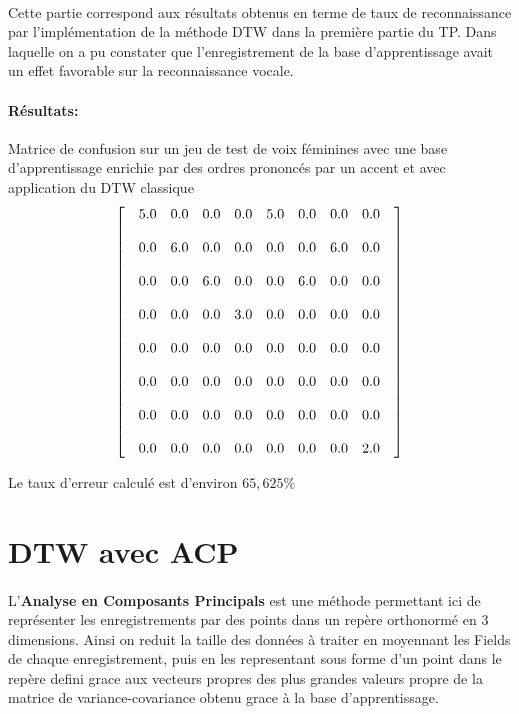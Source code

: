 \documentclass[a4paper,12pt]{report}
\begin{document}
\paragraph{}
Cette partie correspond aux résultats obtenus en terme de taux de reconnaissance par l'implémentation de la méthode DTW dans la première partie du TP. Dans laquelle on a pu constater que l'enregistrement de la base d'apprentissage avait un effet favorable sur la reconnaissance vocale.


\paragraph{Résultats:\\}
 Matrice de confusion sur un jeu de test de voix féminines avec une base d'apprentissage enrichie par des ordres prononcés par un accent  et  avec application du DTW classique
\[
\begin{bmatrix}
  & 5.0 & 0.0 & 0.0 & 0.0  & 5.0 & 0.0 & 0.0 & 0.0 &  \cr \\
  & 0.0 & 6.0 & 0.0 & 0.0  & 0.0 & 0.0 & 6.0 & 0.0 &  \cr \\
  & 0.0 & 0.0 & 6.0 & 0.0  & 0.0 & 6.0 & 0.0 & 0.0 &  \cr \\
  & 0.0 & 0.0 & 0.0 & 3.0  & 0.0 & 0.0 & 0.0 & 0.0 &  \cr \\
  & 0.0 & 0.0 & 0.0 & 0.0  & 0.0 & 0.0 & 0.0 & 0.0 &  \cr \\
  & 0.0 & 0.0 & 0.0 & 0.0  & 0.0 & 0.0 & 0.0 & 0.0 &  \cr \\
  & 0.0 & 0.0 & 0.0 & 0.0  & 0.0 & 0.0 & 0.0 & 0.0 &  \cr \\
  & 0.0 & 0.0 & 0.0 & 0.0  & 0.0 & 0.0 & 0.0 & 2.0 &   
\end{bmatrix}
\]

Le taux d'erreur calculé est d'environ $65,625\%$\\

\newpage
\section{DTW avec ACP}
\paragraph{}
L'\textbf{Analyse en Composants Principals} est une méthode permettant ici de représenter les enregistrements par des points dans un repère orthonormé en 3 dimensions. Ainsi on reduit la taille des données à traiter en moyennant les Fields de chaque enregistrement, puis en les representant sous forme d'un point dans le repère defini grace aux vecteurs propres des plus grandes valeurs propre de la matrice de variance-covariance obtenu grace à la base d'apprentissage.
\end{document}
